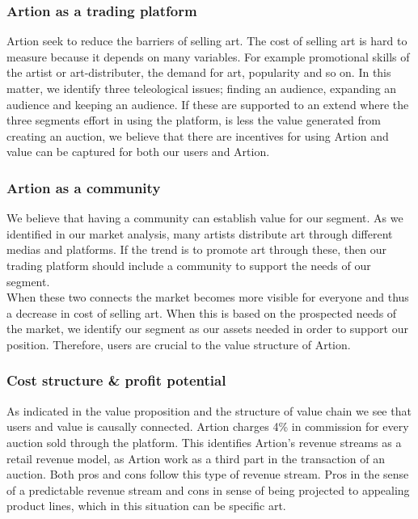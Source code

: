 \subsubsection{Artion as a trading platform}
Artion seek to reduce the barriers of selling art. The cost of selling art is hard to measure because it depends on many variables. For example promotional skills of the artist or art-distributer, the demand for art, popularity and so on. In this matter, we identify three teleological issues; finding an audience, expanding an audience and keeping an audience. If these are supported to an extend where the three segments effort in using the platform, is less the value generated from creating an auction, we believe that there are incentives for using Artion and value can be captured for both our users and Artion. 

\subsubsection{Artion as a community}
We believe that having a community can establish value for our segment. As we identified in our market analysis, many artists distribute art through different medias and platforms. If the trend is to promote art through these, then our trading platform should include a community to support the needs of our segment.\\

When these two connects the market becomes more visible for everyone and thus a decrease in cost of selling art. When this is based on the prospected needs of the market, we identify our segment as our assets needed in order to support our position. Therefore, users are crucial to the value structure of Artion.

\subsubsection*{Cost structure \& profit potential}

As indicated in the value proposition and the structure of value chain we see that users and value is causally connected. Artion charges 4\% in commission for every auction sold through the platform. This identifies Artion’s revenue streams as a retail revenue model, as Artion work as a third part in the transaction of an auction. Both pros and cons follow this type of revenue stream. Pros in the sense of a predictable revenue stream and cons in sense of being projected to appealing product lines, which in this situation can be specific art. 

